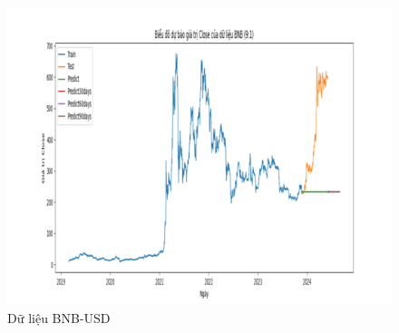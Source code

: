 \documentclass[conference]{IEEEtran}
\begin{document}
\begin{figure}[H]
    \hfill
    \begin{minipage}{0.15\textwidth}
    \centering
    \includegraphics[width=1\textwidth]{Figure/ARIMA_BNB_91.png}
    \end{minipage}
    \caption{Dữ liệu BNB-USD}
    \label{fig:1}
\end{figure}
\end{document}

